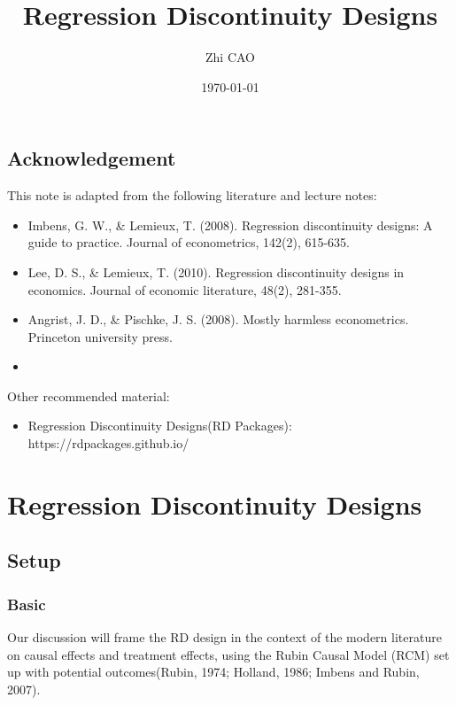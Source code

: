 \documentclass[11pt]{book}%
\begin{document}
\title{	Regression Discontinuity Designs}

\author{Zhi  CAO}

\date{
\today
}

\maketitle

\newpage
\section*{Acknowledgement}
 This note is adapted from the following literature and lecture notes:
\begin{itemize}
	\item Imbens, G. W., \& Lemieux, T. (2008). Regression discontinuity designs: A guide to practice. Journal of econometrics, 142(2), 615-635.
	
	\item Lee, D. S., \& Lemieux, T. (2010). Regression discontinuity designs in economics. Journal of economic literature, 48(2), 281-355.
	
	\item Angrist, J. D., \& Pischke, J. S. (2008). Mostly harmless econometrics. Princeton university press.
	
	\item 
\end{itemize}

Other recommended material:
\begin{itemize}
	\item Regression Discontinuity Designs(RD Packages): https://rdpackages.github.io/
\end{itemize}



	\thispagestyle{empty}
\newpage
\tableofcontents

\newpage
{}

\chapter{Regression Discontinuity Designs}
\section{Setup}
\subsection{Basic}
Our discussion will frame the RD design in the context of the modern literature on causal effects and treatment effects, using the Rubin Causal Model (RCM) set up with potential outcomes(Rubin, 1974; Holland, 1986; Imbens and Rubin, 2007). 
\end{document}

